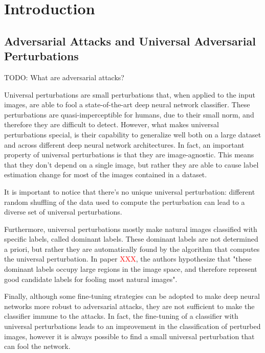 \section{Introduction}
\subsection{Adversarial Attacks and Universal Adversarial Perturbations}
TODO: What are adversarial attacks?

Universal perturbations are small perturbations that, when applied to the input images, are able
to fool a state-of-the-art deep neural network classifier. These perturbations are quasi-imperceptible for humans,
due to their small norm, and therefore they are difficult to detect. However, what makes universal perturbations special,
is their capability to generalize well both on a large dataset and across different deep neural network architectures.
In fact, an important property of universal perturbations is that they are image-agnostic. This means that
they don't depend on a single image, but rather they are able to cause label estimation change for most of
the images contained in a dataset.

It is important to notice that there's no unique universal perturbation: different random shuffling of the data used
to compute the perturbation can lead to a diverse set of universal perturbations.

Furthermore, universal perturbations mostly make natural images classified with specific labels, called dominant labels.
These dominant labels are not determined a priori, but rather they are automatically found by the algorithm that
computes the universal perturbation. In paper \textcolor{red}{XXX}, the authors hypothesize that "these dominant labels occupy large
regions in the image space, and therefore represent good candidate labels for fooling most natural images".

Finally, although some fine-tuning strategies can be adopted to make deep neural networks more robust to adversarial
attacks, they are not sufficient to make the classifier immune to the attacks. In fact, the fine-tuning of a classifier with universal perturbations leads to an improvement in the classification of
perturbed images, however it is always possible to find a small universal perturbation that can fool the network.




